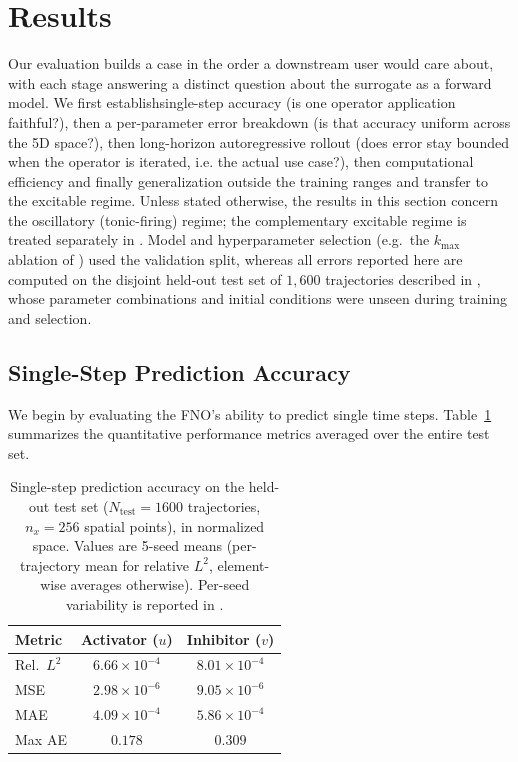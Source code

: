 \documentclass[runningheads]{llncs}
\begin{document}
\FloatBarrier
\section{Results}
\label{sec:results}

Our evaluation builds a case in the order a downstream user would care about, with each stage answering a distinct question about the surrogate as a forward model. We first establishsingle-step accuracy (is one operator application faithful?), then a per-parameter error breakdown (is that accuracy uniform across the 5D space?), then long-horizon autoregressive rollout (does error stay bounded when the operator is iterated, i.e. the actual use case?), then computational efficiency and finally generalization outside the training ranges and transfer to the excitable regime. Unless stated otherwise, the results in this section concern the oscillatory (tonic-firing) regime; the complementary excitable regime is treated separately in . Model and hyperparameter selection (e.g.\ the $k_{\max}$ ablation of ) used the validation split, whereas all errors reported here are computed on the disjoint held-out test set of $1{,}600$ trajectories described in , whose parameter combinations and initial conditions were unseen during training and selection.

\subsection{Single-Step Prediction Accuracy}
\label{sec:single_step_results}

We begin by evaluating the FNO's ability to predict single time steps. Table~\ref{tab:single_step_metrics} summarizes the quantitative performance metrics averaged over the entire test set.

\begin{table}[!ht]
\centering
\begin{small}
\begin{sc}
\setlength{\tabcolsep}{4pt}
\begin{tabular}{lcc}
\toprule
Metric & Activator ($u$) & Inhibitor ($v$) \\
\midrule
Rel.\ $L^2$ & $6.66 \times 10^{-4}$ & $8.01 \times 10^{-4}$ \\
MSE & $2.98 \times 10^{-6}$ & $9.05 \times 10^{-6}$ \\
MAE & $4.09 \times 10^{-4}$ & $5.86 \times 10^{-4}$ \\
Max AE & $0.178$ & $0.309$ \\
\bottomrule
\end{tabular}
\end{sc}
\end{small}
\smallskip
\caption{Single-step prediction accuracy on the held-out test set ($N_{\text{test}} = 1600$ trajectories, $n_x = 256$ spatial points), in normalized space. Values are 5-seed means (per-trajectory mean for relative $L^2$, element-wise averages otherwise). Per-seed variability is reported in .}
\label{tab:single_step_metrics}
\end{table}
\end{document}
